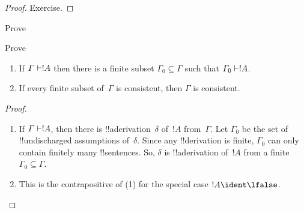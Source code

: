 \documentclass[../../../include/open-logic-section]{subfiles}
\begin{document}
\begin{proof}
Exercise.
\end{proof}

\begin{prob}
Prove 
\end{prob}
\tagendprob

\begin{prob}
Prove 
\end{prob}
\tagendprob

\begin{prop}[Compactness]
  \begin{enumerate}
  \item If $\Gamma \Proves !A$ then there is a finite subset $\Gamma_0
    \subseteq \Gamma$ such that $\Gamma_0 \Proves !A$.
  \item If every finite subset of~$\Gamma$ is
    consistent, then $\Gamma$ is consistent.
  \end{enumerate}
\end{prop}

\begin{proof}
  \begin{enumerate}
    \item If $\Gamma \Proves !A$, then there is
      !!a{derivation}~$\delta$ of~$!A$ from~$\Gamma$. Let $\Gamma_0$
      be the set of !!{undischarged} assumptions of~$\delta$.  Since
      any !!{derivation} is finite, $\Gamma_0$ can only contain
      finitely many !!{sentence}s.  So, $\delta$ is !!a{derivation}
      of~$!A$ from a finite~$\Gamma_0 \subseteq \Gamma$.
    \item This is the contrapositive of (1) for the special case $!A
      \ident \lfalse$.
  \end{enumerate}
\end{proof}
\end{document}
